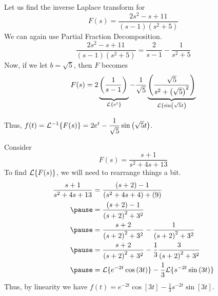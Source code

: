 \documentclass{beamer}
\begin{document}
\begin{frame}
\begin{example}
Let us find the inverse Laplace transform for
\begin{equation*}
F(s)=\dfrac{2s^2-s+11}{(s-1)(s^2+5)}
\end{equation*}\pause
We can again use Partial Fraction Decomposition.
\begin{equation*}
\dfrac{2s^2-s+11}{(s-1)(s^2+5)}=\dfrac{2}{s-1}-\dfrac{1}{s^2+5}
\end{equation*}\pause
Now, if we let $b=\sqrt{5}$, then  $F$ becomes
\begin{equation*}
F(s)=2\underbrace{\left(\dfrac{1}{s-1}\right)\vphantom{\left(\dfrac{\sqrt{5}}{s^2+{\left(\sqrt{5}\right)}^2}\right)}}_{\laplace\{e^t\}}-\dfrac{1}{\sqrt{5}}\underbrace{\left(\dfrac{\sqrt{5}}{s^2+{\left(\sqrt{5}\right)}^2}\right)}_{\laplace\{\sin[\sqrt{5} t]}
\end{equation*}\pause

\vspace{-2mm}
Thus, $f(t)=\laplace^{-1}\{F(s)\}=2e^t-\dfrac{1}{\sqrt{5}}\sin[\sqrt{5} t]$.
\end{example}
\end{frame}

\begin{frame}
\begin{example}
Consider
\begin{equation*}
F(s)=\dfrac{s+1}{s^2+4s+13}
\end{equation*}\pause
To find $\mathcal{L}\{F(s)\}$, we will need to rearrange things a bit.
\begin{equation*}
\begin{aligned}
\dfrac{s+1}{s^2+4s+13} &= \dfrac{(s+2)-1}{(s^2+4s+4)+(9)}\\\pause
&=\dfrac{(s+2)-1}{{(s+2)}^2+3^2}\\\pause
&=\dfrac{s+2}{{(s+2)}^2+3^2}-\dfrac{1}{{(s+2)}^2+3^2}\\\pause
&=\dfrac{s+2}{{(s+2)}^2+3^2}-\dfrac{1}{3}\dfrac{3}{{(s+2)}^2+3^2}\\\pause
&=\laplace\{e^{-2t}\cos[3t]\}-\dfrac{1}{3}\laplace\{s^{-2t}\sin[3t]\}
\end{aligned}
\end{equation*}\pause
Thus, by linearity we have $f(t)=e^{-2t}\cos[3t]-\tfrac{1}{3}s^{-2t}\sin[3t]$.
\end{example}
\end{frame}
\end{document}
